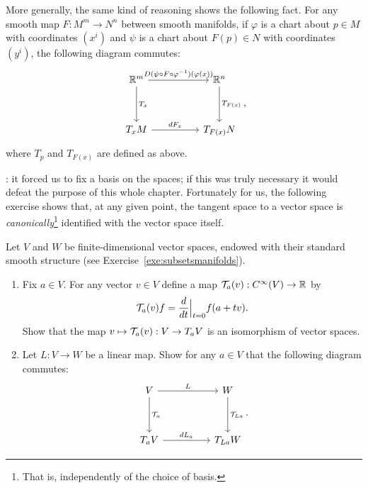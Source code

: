 More generally, the same kind of reasoning shows the following fact. For any smooth map $F:M^m \to N^n$ between smooth manifolds, if $\varphi$ is a chart about $p\in M$ with coordinates $(x^i)$ and $\psi$ is a chart about $F(p)\in N$ with coordinates $(y^i)$, the following diagram commutes:
\begin{equation}
  \begin{tikzcd}[row sep=huge, column sep=huge]
    \R^m \arrow[r, "D(\psi \circ F \circ \varphi^{-1})(\varphi(x))"] \arrow[d, "T_x"]
    & \R^n \arrow[d, "T_{F(x)}"] \\
    T_xM \arrow[r, "dF_x"]
    & T_{F(x)}N
  \end{tikzcd},
\end{equation}
where $T_p$ and $T_{F(x)}$ are defined as above.

: it forced us to fix a basis on the spaces; if this was truly necessary it would defeat the purpose of this whole chapter.
Fortunately for us, the following exercise shows that, at any given point, the tangent space to a vector space is \emph{canonically}\footnote{That is, independently of the choice of basis.} identified with the vector space itself.

\begin{exercise}[\textit{[homework 2]}]\label{ex:tg_curve_iso}
  Let $V$ and $W$ be finite-dimensional vector spaces, endowed with their standard smooth structure (see Exercise~\ref{exe:subsetsmanifolds}).
  \begin{enumerate}
    \item Fix $a\in V$. For any vector $v\in V$ define a map $\mathcal{T}_a(v) : C^\infty(V) \to \mathbb{R}$ by
    \begin{equation}
      \mathcal{T}_a(v) f = \frac{d}{dt}\Big|_{t=0} f(a + tv).
    \end{equation}
    Show that the map $v\mapsto \mathcal{T}_a(v) : V \to T_aV$ is an isomorphism of vector spaces.
    \item Let $L:V\to W$ be a linear map. Show for any $a\in V$ that the following diagram commutes:
    \begin{equation}
    \begin{tikzcd}[row sep=huge, column sep=huge]
      V \arrow[r, "L"] \arrow[d, "\cT_a"]
      & W \arrow[d, "\cT_{La}"] \\
      T_aV \arrow[r, "dL_a"]
      & T_{La}W
    \end{tikzcd}.
  \end{equation}
  \end{enumerate}
\end{exercise}

